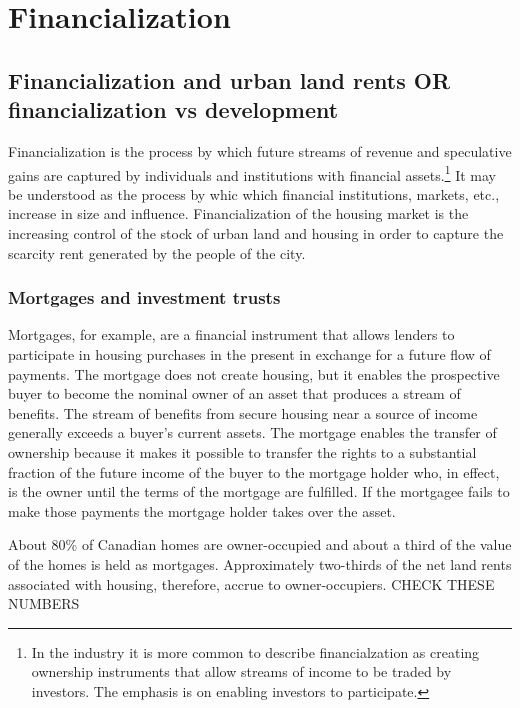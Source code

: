 \chapter{Financialization} \label{chapter-financialization}

\section{Financialization and urban land rents OR financialization vs development}

Financialization is %
the process by which future streams of revenue and speculative gains are %
captured by individuals and institutions with financial assets.\footnote{In the industry it is more common to describe financialzation as creating ownership instruments that allow streams of income to be traded by investors. The emphasis is on enabling investors to participate.} It may be understood as the process by whic which financial institutions, markets, etc., increase in size and influence. Financialization of the housing market is the increasing control of the stock of urban land and housing in order to capture the scarcity rent generated by the people of the city.  

\subsection{Mortgages and investment trusts}

Mortgages, for example, are a financial instrument that allows lenders to  participate in housing purchases in the present in exchange for a future flow of payments.  The mortgage does not create housing, but it enables the prospective buyer to become the nominal owner of an asset that produces a stream of benefits. The stream of benefits from secure housing near a source of income generally exceeds a buyer's current assets. The mortgage enables the  transfer of ownership because it makes it possible to transfer the rights to a substantial fraction of the future income of the buyer to the mortgage holder who, in effect, is the owner until the terms of the mortgage are fulfilled.  If the mortgagee fails to make those payments the mortgage holder takes over the asset. 

About 80\% of Canadian homes are owner-occupied and about a third of the value of the homes is held as mortgages. Approximately two-thirds of the net land rents associated with housing, therefore, accrue to owner-occupiers. {\color {red}CHECK THESE NUMBERS } 


